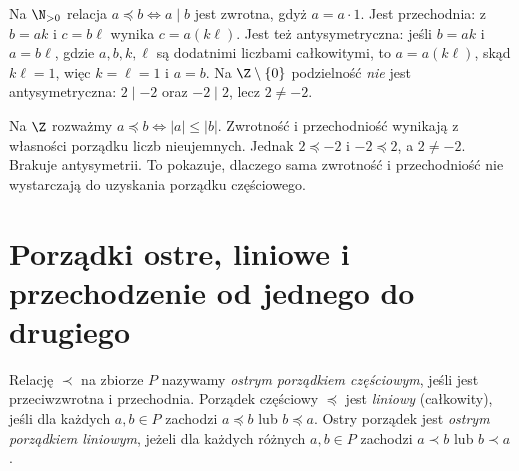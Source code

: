 \begin{przyklad}
Na $\N_{>0}$ relacja $a\preceq b\iff a\mid b$ jest
zwrotna, gdyż $a=a\cdot1$. Jest przechodnia: z
$b=ak$ i $c=b\ell$ wynika $c=a(k\ell)$.
Jest też antysymetryczna: jeśli $b=ak$ i $a=b\ell$,
gdzie $a,b,k,\ell$ są dodatnimi liczbami całkowitymi, to
$a=a(k\ell)$, skąd $k\ell=1$, więc $k=\ell=1$ i $a=b$.
Na $\Z\setminus\{0\}$ podzielność \emph{nie} jest
antysymetryczna: $2\mid -2$ oraz $-2\mid2$, lecz $2\ne-2$.
\end{przyklad}

\begin{przyklad}
Na $\Z$ rozważmy $a\preceq b\iff |a|\le |b|$.
Zwrotność i przechodniość wynikają z własności porządku
liczb nieujemnych. Jednak $2\preceq -2$ i
$-2\preceq2$, a $2\ne-2$. Brakuje antysymetrii.
To pokazuje, dlaczego sama zwrotność i przechodniość
nie wystarczają do uzyskania porządku częściowego.
\end{przyklad}

\section{Porządki ostre, liniowe i przechodzenie od jednego do drugiego}
\label{sec:order-strict}
\begin{definicja}\label{def:strict-total}
Relację $\prec$ na zbiorze $P$ nazywamy \emph{ostrym porządkiem
częściowym}, jeśli jest przeciwzwrotna i przechodnia.
Porządek częściowy $\preceq$ jest \emph{liniowy} (całkowity),
jeśli dla każdych $a,b\in P$ zachodzi $a\preceq b$ lub
$b\preceq a$. Ostry porządek jest \emph{ostrym porządkiem
liniowym}, jeżeli dla każdych różnych $a,b\in P$ zachodzi
$a\prec b$ lub $b\prec a$.
\end{definicja}

